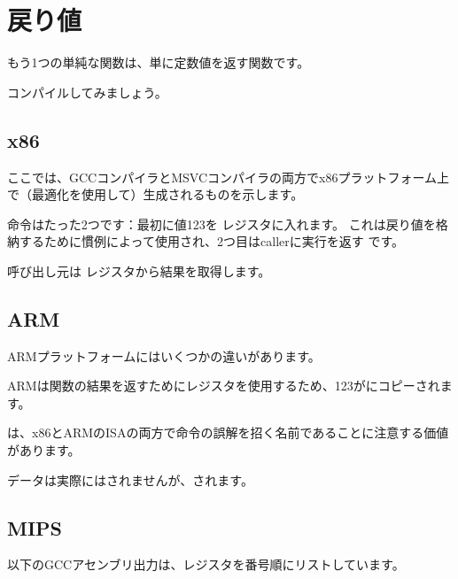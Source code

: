 \section{戻り値}
\label{ret_val_func}

もう1つの単純な関数は、単に定数値を返す関数です。



コンパイルしてみましょう。

\subsection{x86}

ここでは、GCCコンパイラとMSVCコンパイラの両方でx86プラットフォーム上で（最適化を使用して）生成されるものを示します。



命令はたった2つです：最初に値123を \EAX レジスタに入れます。
これは戻り値を格納するために慣例によって使用され、2つ目は\gls{caller}に実行を返す \RET です。

呼び出し元は \EAX レジスタから結果を取得します。

\subsection{ARM}

ARMプラットフォームにはいくつかの違いがあります。



ARMは関数の結果を返すためにレジスタを使用するため、123がにコピーされます。

\MOV は、x86とARMの\ac{ISA}の両方で命令の誤解を招く名前であることに注意する価値があります。 

データは実際にはされませんが、されます。

\subsection{MIPS}

\label{MIPS_leaf_function_ex1}

以下のGCCアセンブリ出力は、レジスタを番号順にリストしています。

